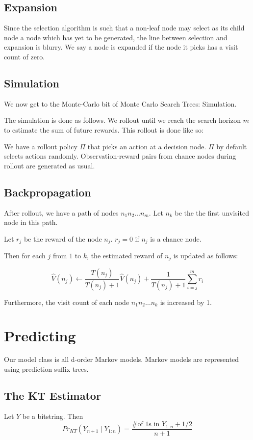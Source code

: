 \documentclass[12pt,a4paper,twoside]{article}
\theoremstyle{upright}
\begin{document}
\subsection{Expansion}
Since the selection algorithm is such that a non-leaf node may select as its child node a node which has yet to 
be generated, the line between selection and expansion is blurry. We say a node is expanded if the node it picks
has a visit count of zero.
\subsection{Simulation}
We now get to the Monte-Carlo bit of Monte Carlo Search Trees: Simulation.

The simulation is done as follows. We rollout until we reach the search horizon $m$ to estimate the sum of 
future rewards. This rollout is done like so:

 We have a rollout policy $\Pi$ that picks an action at a decision node. $\Pi$ by default selects actions randomly.
Observation-reward pairs from chance nodes during rollout are generated as usual.   
\subsection{Backpropagation}

After rollout, we have a path of nodes $n_1n_2 \ldots n_m$.
Let $n_k$ be the the first unvisited node in this path. 

Let $r_j$ be the reward of the node $n_j$. $r_j = 0$ if $n_j$ is a chance node.

Then for each $j$ from $1$ to $k$, the estimated reward of $n_j$ is updated as follows:

\begin{equation}
\hat V (n_j) \leftarrow \frac{T(n_j)}{T(n_j) + 1} \hat V(n_j) + \frac{1}{T(n_j)+1} \sum_{i=j}^{m}r_i
\end{equation}

Furthermore, the visit count of each node $n_1 n_2 \ldots n_k$ is increased by 1.
\section{Predicting}

Our model class is all d-order Markov models. Markov models are represented using prediction suffix trees.


\subsection{The KT Estimator}
Let $Y$ be a bitstring.
Then 
\[
Pr_{KT}(Y_{n+1} \mid Y_{1:n}) =
\frac{\text{\# of 1s in $Y_{1:n}$} + 1/2}{n+1}
\]
\end{document}
